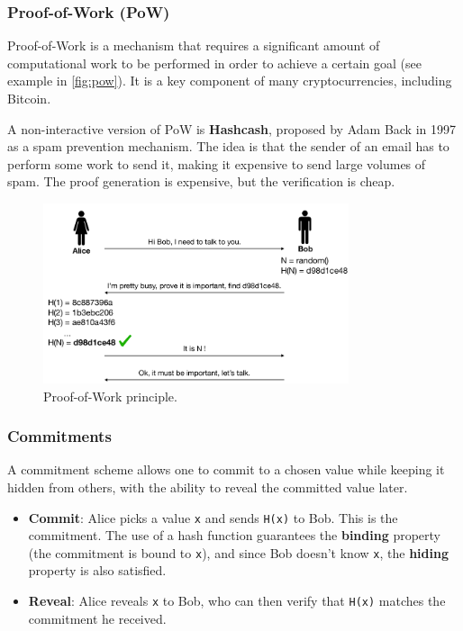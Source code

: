 \subsubsection{Proof-of-Work (PoW)}\label{proof-of-work-pow}

Proof-of-Work is a mechanism that requires a significant amount of
computational work to be performed in order to achieve a certain goal (see example in \autoref{fig:pow}).
It is a key component of many cryptocurrencies, including Bitcoin.

A non-interactive version of PoW is \textbf{Hashcash}, proposed by Adam
Back in 1997 as a spam prevention mechanism. The idea is that the sender
of an email has to perform some work to send it, making it expensive to
send large volumes of spam. The proof generation is expensive, but the
verification is cheap.

\begin{figure}[!b]
	\begin{center}
		\includegraphics[width=0.8\textwidth]{./figs/pow.png} 
		\caption{Proof-of-Work principle.}		
		\label{fig:pow}
	\end{center}	
\end{figure}


\subsubsection{Commitments}\label{commitments}

A commitment scheme allows one to commit to a chosen value while keeping
it hidden from others, with the ability to reveal the committed value
later.

\begin{itemize}
	\tightlist
	\item
	\textbf{Commit}: Alice picks a value \texttt{x} and sends
	\texttt{H(x)} to Bob. This is the commitment. The use of a hash
	function guarantees the \textbf{binding} property (the commitment is
	bound to \texttt{x}), and since Bob doesn't know \texttt{x}, the
	\textbf{hiding} property is also satisfied.
	\item
	\textbf{Reveal}: Alice reveals \texttt{x} to Bob, who can then verify
	that \texttt{H(x)} matches the commitment he received.
\end{itemize}

